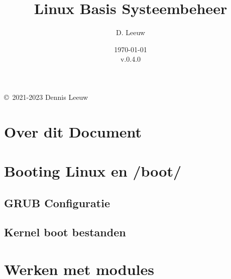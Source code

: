 \documentclass[a4paper,12pt,twoside,openright,titlepage]{book}
\author{D. Leeuw}
\title{Linux Basis Systeembeheer}
\date{\today\\v.0.4.0}
\begin{document}

\maketitle

\copyright\ 2021-2023 Dennis Leeuw\\




\frontmatter
\chapter{Over dit Document}
%
%

\tableofcontents

\mainmatter
%

%

\chapter{Booting Linux en /boot/}

\section{GRUB Configuratie}

\section{Kernel boot bestanden}


\chapter{Werken met modules}


\end{document}
